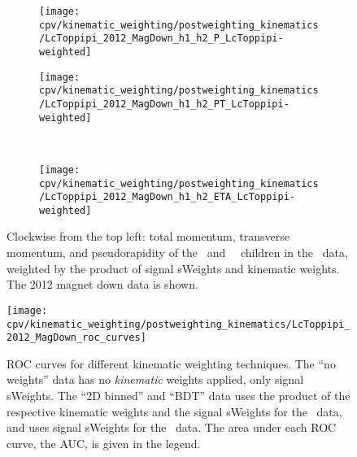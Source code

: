 \begin{figure}
  \begin{subfigure}[b]{0.5\textwidth}
    \centering
    \texttt{[image: cpv/kinematic\_weighting/postweighting\_kinematics/LcToppipi\_2012\_MagDown\_h1\_h2\_P\_LcToppipi-weighted]}
    \label{fig:cpv:kinematic_weighting:post:ppipi_h1h2:P}
  \end{subfigure}
  \begin{subfigure}[b]{0.5\textwidth}
    \centering
    \texttt{[image: cpv/kinematic\_weighting/postweighting\_kinematics/LcToppipi\_2012\_MagDown\_h1\_h2\_PT\_LcToppipi-weighted]}
    \label{fig:cpv:kinematic_weighting:post:ppipi_h1h2:PT}
  \end{subfigure}\\
  \begin{subfigure}[b]{\textwidth}
    \centering
    \texttt{[image: cpv/kinematic\_weighting/postweighting\_kinematics/LcToppipi\_2012\_MagDown\_h1\_h2\_ETA\_LcToppipi-weighted]}
    \label{fig:cpv:kinematic_weighting:post:ppipi_h1h2:ETA}
  \end{subfigure}
  \caption{%
    Clockwise from the top left: total momentum, transverse momentum, and 
    pseudorapidity of the \Ppiminus\ and \Ppiplus\ \PLambdac\ children in the 
    \ppipi\ data, weighted by the product of signal sWeights and kinematic 
    weights.
    The 2012 magnet down data is shown.
  }
  \label{fig:cpv:kinematic_weighting:post:ppipi_h1h2}
\end{figure}

\begin{figure}
  \texttt{[image: cpv/kinematic\_weighting/postweighting\_kinematics/LcToppipi\_2012\_MagDown\_roc\_curves]}
  \caption{%
    ROC curves for different kinematic weighting techniques.
    The ``no weights'' data has no \emph{kinematic} weights applied, only 
    signal sWeights.
    The ``2D binned'' and ``\ac{BDT}'' data uses the product of the respective 
    kinematic weights and the signal sWeights for the \ppipi\ data, and uses
    signal sWeights for the \pKK\ data.
    The area under each \ac{ROC} curve, the \acs{AUC}, is given in the legend.
  }
  \label{fig:cpv:kinematic_weighting:post:roc}
\end{figure}
